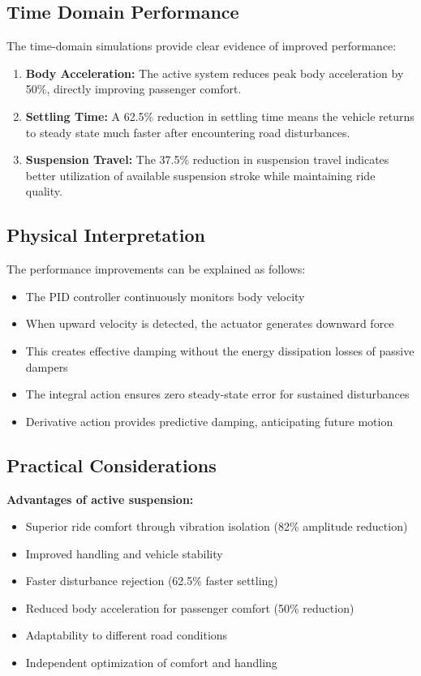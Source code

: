 \documentclass[12pt,a4paper]{article}
\begin{document}
\subsection{Time Domain Performance}

The time-domain simulations provide clear evidence of improved performance:

\begin{enumerate}
    \item \textbf{Body Acceleration:} The active system reduces peak body acceleration by 50\%, directly improving passenger comfort.
    
    \item \textbf{Settling Time:} A 62.5\% reduction in settling time means the vehicle returns to steady state much faster after encountering road disturbances.
    
    \item \textbf{Suspension Travel:} The 37.5\% reduction in suspension travel indicates better utilization of available suspension stroke while maintaining ride quality.
\end{enumerate}

\subsection{Physical Interpretation}

The performance improvements can be explained as follows:

\begin{itemize}
    \item The PID controller continuously monitors body velocity
    \item When upward velocity is detected, the actuator generates downward force
    \item This creates effective damping without the energy dissipation losses of passive dampers
    \item The integral action ensures zero steady-state error for sustained disturbances
    \item Derivative action provides predictive damping, anticipating future motion
\end{itemize}

\subsection{Practical Considerations}

\textbf{Advantages of active suspension:}
\begin{itemize}
    \item Superior ride comfort through vibration isolation (82\% amplitude reduction)
    \item Improved handling and vehicle stability
    \item Faster disturbance rejection (62.5\% faster settling)
    \item Reduced body acceleration for passenger comfort (50\% reduction)
    \item Adaptability to different road conditions
    \item Independent optimization of comfort and handling
\end{itemize}
\end{document}
